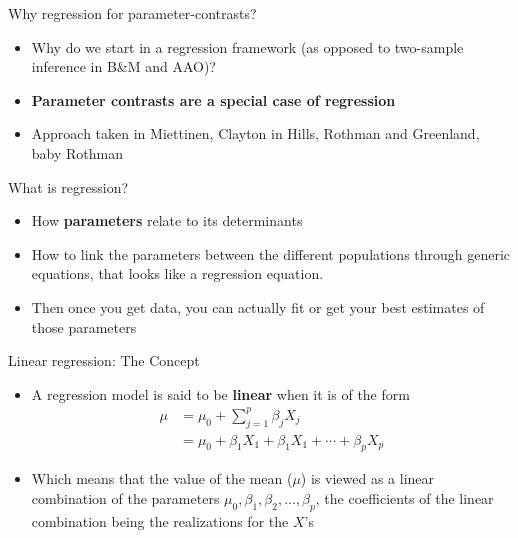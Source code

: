 \documentclass{beamer}\usepackage[]{graphicx}\usepackage[]{color}
\begin{document}
\begin{frame}{Why regression for parameter-contrasts?}

\begin{itemize}
	\setlength\itemsep{1.5em}
\item Why do we start in a regression framework (as opposed to two-sample inference in B\&M and AAO)? \pause 
\item \textbf{Parameter contrasts are a special case of regression} \pause 
\item Approach taken in Miettinen, Clayton in Hills, Rothman and Greenland, baby Rothman
\end{itemize}

\end{frame}


\begin{frame}{What is regression?}

\begin{itemize}
	\setlength\itemsep{2em}
\item How \textbf{parameters} relate to its determinants \pause
\item How to link the parameters between the different populations through generic equations, that looks like a regression equation. \pause 
\item Then once you get data, you can actually fit or get your best estimates of those parameters
\end{itemize}

\end{frame}

\begin{frame}{Linear regression: The Concept}

\begin{itemize}
	\setlength\itemsep{2em}
	\item A regression model is said to be \textbf{linear} when it is of the form 
	\begin{align*}
	\mu & = \mu_0 + \sum_{j=1}^p \beta_j X_j \\
	& = \mu_0 + \beta_1 X_1 +  \beta_1 X_1 + \cdots +  \beta_p X_p
	\end{align*}
	
	\item Which means that the value of the mean ($\mu$) is viewed as a linear combination of the parameters $\mu_0, \beta_1, \beta_2, \ldots, \beta_p$, the coefficients of the linear combination being the realizations for the $X$'s

\end{itemize}

\end{frame}
\end{document}
